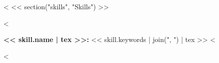 <%
<< section("skills", "Skills") >>
\begin{description}
<%
  \item \textbf{<< skill.name | tex >>:} << skill.keywords | join(", ") | tex >>
<%
\end{description}

<%
